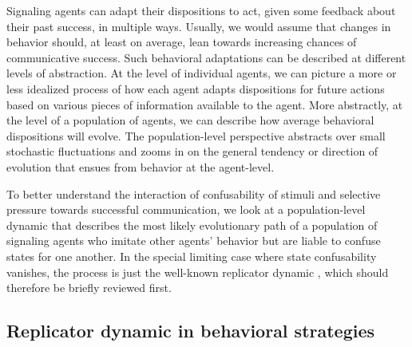 \documentclass[fleqn,reqno,10pt]{article}
\begin{document}
Signaling agents can adapt their dispositions to act, given some feedback about their past
success, in multiple ways. Usually, we would assume that changes in behavior should, at least
on average, lean towards increasing chances of communicative success. Such behavioral
adaptations can be described at different levels of abstraction. At the level of individual
agents, we can picture a more or less idealized process of how each agent adapts dispositions
for future actions based on various pieces of information available to the agent. More
abstractly, at the level of a population of agents, we can describe how average behavioral
dispositions will evolve. The population-level perspective abstracts over small stochastic
fluctuations and zooms in on the general tendency or direction of evolution that ensues from
behavior at the agent-level.

To better understand the interaction of confusability of stimuli and selective pressure towards
successful communication, we look at a population-level dynamic that describes the most likely
evolutionary path of a population of signaling agents who imitate other agents' behavior but
are liable to confuse states for one another. In the special limiting case where state
confusability vanishes, the process is just the well-known replicator dynamic
\citep{TaylorJonker1978:Evolutionary-St}, which should therefore be briefly reviewed first.


\subsection{Replicator dynamic in behavioral strategies}
\label{sec:repl-dynam-behav}
\end{document}
